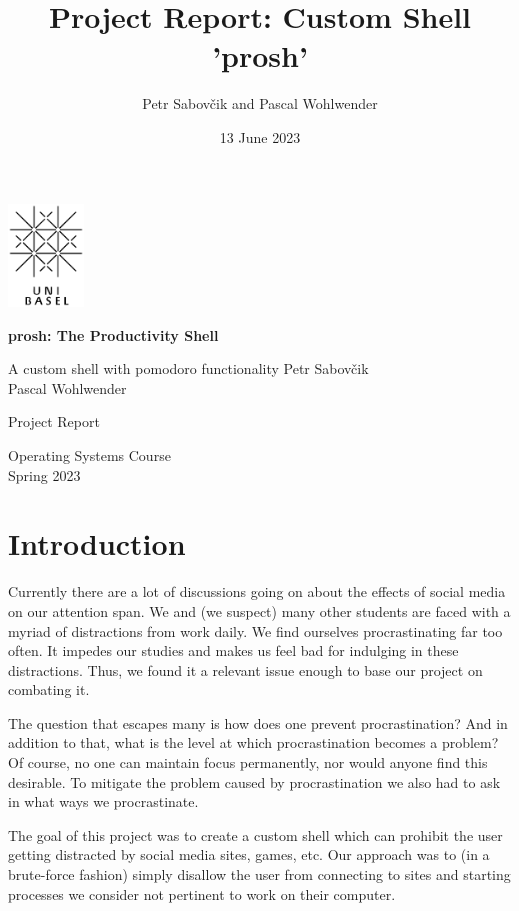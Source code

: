 \documentclass{article}
\title{Project Report: Custom Shell 'prosh'}
\date{13 June 2023}
\author{Petr Sabovčik and Pascal Wohlwender}
\begin{document}
\begin{titlepage}
	\begin{center}
		\includegraphics[width=0.15\textwidth]{uni_basel_logo.png}\par
		\vfill
		\huge \textbf{prosh: The Productivity Shell}\par
		\Large A custom shell with pomodoro functionality
		\vfill
		\large Petr Sabovčik\\Pascal Wohlwender\par
		\vspace{3cm}
		\normalsize
		Project Report\par
		Operating Systems Course\\
		Spring 2023
	\end{center}
	\thispagestyle{empty}
\end{titlepage}

\tableofcontents
\thispagestyle{empty}
\pagebreak
{}

\section{Introduction}

Currently there are a lot of discussions going on about the effects of social media on our attention span. We and (we suspect) many other students are faced with a myriad of distractions from work daily. We find ourselves procrastinating far too often. It impedes our studies and makes us feel bad for indulging in these distractions. Thus, we found it a relevant issue enough to base our project on combating it. 

The question that escapes many is how does one prevent procrastination? And in addition to that, what is the level at which procrastination becomes a problem? Of course, no one can maintain focus permanently, nor would anyone find this desirable. To mitigate the problem caused by procrastination we also had to ask in what ways we procrastinate. 

The goal of this project was to create a custom shell which can prohibit the user getting distracted by social media sites, games, etc. Our approach was to (in a brute-force fashion) simply disallow the user from connecting to sites and starting processes we consider not pertinent to work on their computer. 
\end{document}
